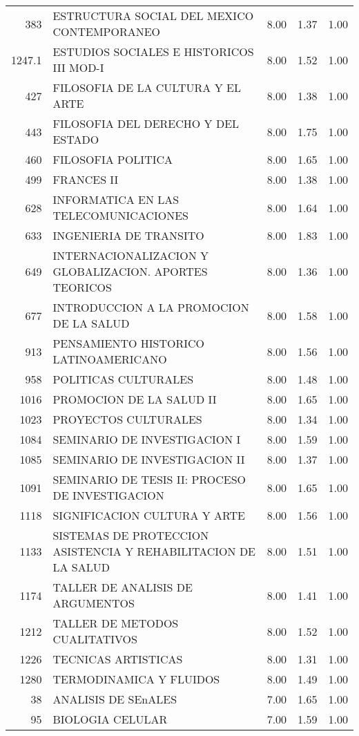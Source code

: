 \begin{table}[ht]
\begin{tabular}{rlrrr}
  383 & ESTRUCTURA SOCIAL DEL MEXICO CONTEMPORANEO & 8.00 & 1.37 & 1.00 \\ 
  1247.1 & ESTUDIOS SOCIALES E HISTORICOS III MOD-I & 8.00 & 1.52 & 1.00 \\ 
  427 & FILOSOFIA DE LA CULTURA Y EL ARTE & 8.00 & 1.38 & 1.00 \\ 
  443 & FILOSOFIA DEL DERECHO Y DEL ESTADO & 8.00 & 1.75 & 1.00 \\ 
  460 & FILOSOFIA POLITICA & 8.00 & 1.65 & 1.00 \\ 
  499 & FRANCES II & 8.00 & 1.38 & 1.00 \\ 
  628 & INFORMATICA EN LAS TELECOMUNICACIONES & 8.00 & 1.64 & 1.00 \\ 
  633 & INGENIERIA DE TRANSITO & 8.00 & 1.83 & 1.00 \\ 
  649 & INTERNACIONALIZACION Y GLOBALIZACION. APORTES TEORICOS & 8.00 & 1.36 & 1.00 \\ 
  677 & INTRODUCCION A LA PROMOCION DE LA SALUD & 8.00 & 1.58 & 1.00 \\ 
  913 & PENSAMIENTO HISTORICO LATINOAMERICANO & 8.00 & 1.56 & 1.00 \\ 
  958 & POLITICAS CULTURALES & 8.00 & 1.48 & 1.00 \\ 
  1016 & PROMOCION DE LA SALUD II & 8.00 & 1.65 & 1.00 \\ 
  1023 & PROYECTOS CULTURALES & 8.00 & 1.34 & 1.00 \\ 
  1084 & SEMINARIO DE INVESTIGACION I & 8.00 & 1.59 & 1.00 \\ 
  1085 & SEMINARIO DE INVESTIGACION II & 8.00 & 1.37 & 1.00 \\ 
  1091 & SEMINARIO DE TESIS II: PROCESO DE INVESTIGACION & 8.00 & 1.65 & 1.00 \\ 
  1118 & SIGNIFICACION CULTURA Y ARTE & 8.00 & 1.56 & 1.00 \\ 
  1133 & SISTEMAS DE PROTECCION ASISTENCIA Y REHABILITACION DE LA SALUD & 8.00 & 1.51 & 1.00 \\ 
  1174 & TALLER DE ANALISIS DE ARGUMENTOS & 8.00 & 1.41 & 1.00 \\ 
  1212 & TALLER DE METODOS CUALITATIVOS & 8.00 & 1.52 & 1.00 \\ 
  1226 & TECNICAS ARTISTICAS & 8.00 & 1.31 & 1.00 \\ 
  1280 & TERMODINAMICA Y FLUIDOS & 8.00 & 1.49 & 1.00 \\ 
  38 & ANALISIS DE SEnALES & 7.00 & 1.65 & 1.00 \\ 
  95 & BIOLOGIA CELULAR & 7.00 & 1.59 & 1.00 \\ 

\end{tabular}
\end{table}

